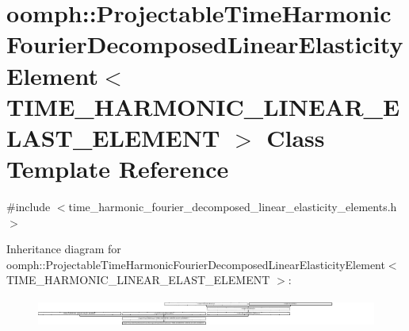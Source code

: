 \hypertarget{classoomph_1_1ProjectableTimeHarmonicFourierDecomposedLinearElasticityElement}{}\section{oomph\+:\+:Projectable\+Time\+Harmonic\+Fourier\+Decomposed\+Linear\+Elasticity\+Element$<$ T\+I\+M\+E\+\_\+\+H\+A\+R\+M\+O\+N\+I\+C\+\_\+\+L\+I\+N\+E\+A\+R\+\_\+\+E\+L\+A\+S\+T\+\_\+\+E\+L\+E\+M\+E\+NT $>$ Class Template Reference}
\label{classoomph_1_1ProjectableTimeHarmonicFourierDecomposedLinearElasticityElement}


{\ttfamily \#include $<$time\+\_\+harmonic\+\_\+fourier\+\_\+decomposed\+\_\+linear\+\_\+elasticity\+\_\+elements.\+h$>$}

Inheritance diagram for oomph\+:\+:Projectable\+Time\+Harmonic\+Fourier\+Decomposed\+Linear\+Elasticity\+Element$<$ T\+I\+M\+E\+\_\+\+H\+A\+R\+M\+O\+N\+I\+C\+\_\+\+L\+I\+N\+E\+A\+R\+\_\+\+E\+L\+A\+S\+T\+\_\+\+E\+L\+E\+M\+E\+NT $>$\+:\begin{figure}[H]
\begin{center}
\leavevmode
\includegraphics[height=0.943396cm]{classoomph_1_1ProjectableTimeHarmonicFourierDecomposedLinearElasticityElement}
\end{center}
\end{figure}
